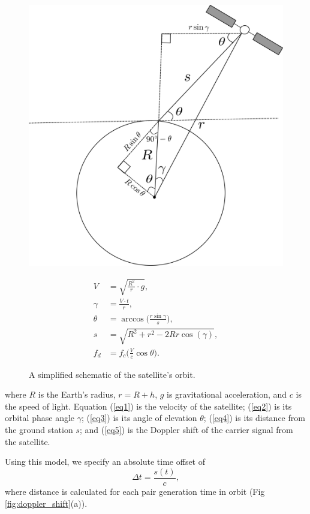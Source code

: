 \begin{figure}[ht!]
	\begin{minipage}{.5\textwidth}
	\centering
	\includegraphics[width=0.75\linewidth]{assets/orbit.png}
	\label{fig:orbit}
	\end{minipage}%
	\begin{minipage}{.5\textwidth}
		\begin{align}
		V &= \sqrt{\frac{R^2}{r} \cdot g}, \label{eq1} \\
		\gamma &= \frac{V \cdot t}{r}, \label{eq2} \\
		\theta &= \arccos\Big(\frac{r\sin\gamma}{s}\Big), \label{eq3} \\
		s &= \sqrt{R^2 + r^2 - 2Rr\cos(\gamma)}, \label{eq4}\\
		f_d &= f_c \Big(\frac{V}{c} \cos\theta\Big). \label{eq5}
		\end{align}
	\end{minipage}
	\caption{A simplified schematic of the satellite's orbit.}
\end{figure}

\noindent where $R$ is the Earth's radius, $r = R + h$, $g$ is gravitational acceleration, and $c$ is the speed of light. Equation (\ref{eq1}) is the velocity of the satellite; (\ref{eq2}) is its orbital phase angle $\gamma$; (\ref{eq3}) is its angle of elevation $\theta$; (\ref{eq4}) is its distance from the ground station $s$; and (\ref{eq5}) is the Doppler shift of the carrier signal from the satellite.

Using this model, we specify an absolute time offset of 
\begin{equation}
\Delta t = \frac{s(t)}{c}, \label{eq6}
\end{equation}
where distance is calculated for each pair generation time in orbit (Fig \ref{fig:doppler_shift}(a)). 

